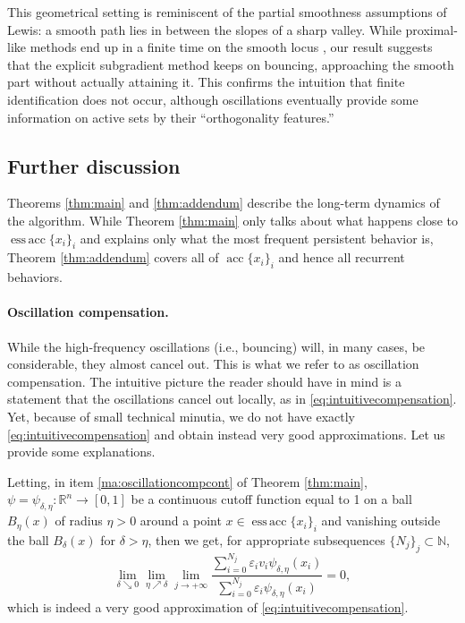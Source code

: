 \documentclass[11pt]{article}
\theoremstyle{definition}
\theoremstyle{remark}
\DeclareMathOperator{\acc}{acc}
\DeclareMathOperator{\essacc}{ess\,acc}
\newcommand{\R}{\mathbb{R}}
\newcommand{\N}{\mathbb{N}}
\begin{document}
This geometrical setting  is reminiscent of the partial smoothness assumptions of Lewis: a smooth path  lies in between the slopes of a sharp valley. While proximal-like methods end up in a finite time on the smooth locus \cite[Theorem 4.1]{hare2004identifying}, our result suggests that the explicit subgradient method keeps on bouncing, approaching the smooth part without actually attaining it. This confirms the intuition that finite identification does not occur, although oscillations eventually provide some information on active sets by their 
``orthogonality features.''
%
\subsection{Further discussion}
\label{sec:interpretations}

Theorems \ref{thm:main} and \ref{thm:addendum} describe the long-term dynamics of the algorithm. While Theorem \ref{thm:main} only talks about what happens close to $\essacc\{x_i\}_i$ and explains only what the most frequent persistent behavior is, Theorem \ref{thm:addendum} covers all of $\acc\{x_i\}_i$ and hence all recurrent behaviors. 

\paragraph{Oscillation compensation.} 
%
While the high-frequency oscillations (i.e., bouncing) will, in many cases, be considerable, they almost cancel out. This is what we refer to as oscillation compensation. The intuitive picture the reader should have in mind is a statement that the oscillations cancel out locally, as in \eqref{eq:intuitivecompensation}. %
%
%
%
Yet, because of small technical minutia, we do not have exactly  \eqref{eq:intuitivecompensation} and obtain instead very good approximations.
 Let us provide some explanations. 

Letting, in item \ref{ma:oscillationcompcont} of Theorem \ref{thm:main},
$\psi=\psi_{\delta,\eta}\colon\R^n\to[0,1]$ be a continuous cutoff function equal to 1 on a ball $B_\eta(x)$ of radius $\eta>0$ around a point $x\in\essacc\{x_i\}_i$ and vanishing outside the ball $B_\delta(x)$ for $\delta>\eta$, then we get, for appropriate subsequences $\{N_j\}_j\subset\N$,
\[\lim_{\delta\searrow0}\lim_{\eta\nearrow \delta}\lim_{j\to +\infty}\frac{\displaystyle\sum_{i=0}^{N_j}\varepsilon_iv_i\psi_{\delta,\eta}(x_i)}{\displaystyle\sum_{i=0}^{N_j}\varepsilon_i\psi_{\delta,\eta}(x_i)}=0,\]
which is indeed a very good approximation of \eqref{eq:intuitivecompensation}.
%
%
%
%
\end{document}
